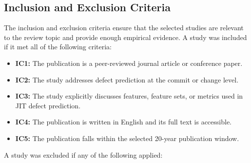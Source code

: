 \documentclass[sigconf,review]{acmart}
\begin{document}
\subsection{Inclusion and Exclusion Criteria}
\label{subsec:eligibility-criteria}

The inclusion and exclusion criteria ensure that the selected studies are relevant to the review topic and provide enough empirical evidence. A study was included if it met all of the following criteria:

\begin{itemize}
    \item \textbf{IC1:} The publication is a peer-reviewed journal article or conference paper.
    \item \textbf{IC2:} The study addresses defect prediction at the commit or change level.
    \item \textbf{IC3:} The study explicitly discusses features, feature sets, or metrics used in JIT defect prediction.
    \item \textbf{IC4:} The publication is written in English and its full text is accessible.
    \item \textbf{IC5:} The publication falls within the selected 20-year publication window.
\end{itemize}

\noindent A study was excluded if any of the following applied:
\end{document}
